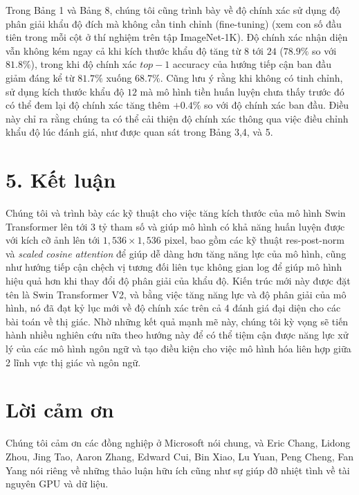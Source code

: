 \documentclass[times, twocolumn]{zHenriquesLab-StyleBioRxiv}
\begin{document}
Trong Bảng 1 và Bảng 8, chúng tôi cũng trình bày về độ chính xác sử dụng độ phân giải khẩu độ đích mà không cần tinh chỉnh (fine-tuning) (xem con số đầu tiên trong mỗi cột ở thí nghiệm trên tập ImageNet-1K). Độ chính xác nhận diện vẫn không kém ngay cả khi kích thước khẩu độ tăng từ $8$ tới $24$ ($78.9\%$ so với $81.8\%$), trong khi độ chính xác $top-1$ accuracy của hướng tiếp cận ban đầu giảm đáng kể từ $81.7\%$ xuống $68.7\%$. Cũng lưu ý rằng khi không có tinh chỉnh, sử dụng kích thước khẩu độ $12$ mà mô hình tiền huấn luyện chưa thấy trước đó có thể đem lại độ chính xác tăng thêm $+0.4\%$ so với độ chính xác ban đầu. Điều này chỉ ra rằng chúng ta có thể cải thiện độ chính xác thông qua việc điều chỉnh khẩu độ lúc đánh giá, như được quan sát trong Bảng 3,4, và 5.

\section*{5. Kết luận}
Chúng tôi và trình bày các kỹ thuật cho việc tăng kích thước của mô hình Swin Transformer lên tới $3$ tỷ tham số và giúp mô hình có khả năng huấn luyện được với kích cỡ ảnh lên tới $1,536 \times 1,536$ pixel, bao gồm các kỹ thuật res-post-norm và \textit{scaled cosine attention} để giúp dễ dàng hơn tăng năng lực của mô hình, cũng như hướng tiếp cận chệch vị tương đối liên tục không gian log để giúp mô hình hiệu quả hơn khi thay đổi độ phân giải của khẩu độ. Kiến trúc mới này được đặt tên là Swin Transformer V2, và bằng việc tăng năng lực và độ phân giải của mô hình, nó đã đạt kỷ lục mới về độ chính xác trên cả 4 đánh giá đại diện cho các bài toán về thị giác. Nhờ những kết quả mạnh mẽ này, chúng tôi kỳ vọng sẽ tiến hành nhiều nghiên cứu nữa theo hướng này để có thể tiệm cận được năng lực xử lý của các mô hình ngôn ngữ và tạo điều kiện cho việc mô hình hóa liên hợp giữa 2 lĩnh vực thị giác và ngôn ngữ.

\section*{Lời cảm ơn}
Chúng tôi cảm ơn các đồng nghiệp ở Microsoft nói chung, và Eric Chang, Lidong Zhou, Jing Tao, Aaron Zhang, Edward Cui, Bin Xiao, Lu Yuan, Peng Cheng, Fan Yang nói riêng về những thảo luận hữu ích cũng như sự giúp đỡ nhiệt tình về tài nguyên GPU và dữ liệu.

\end{document}
